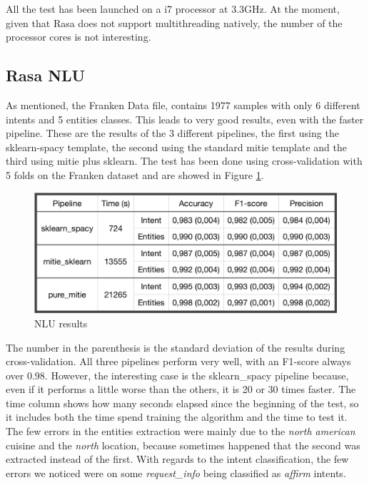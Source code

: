 \documentclass[11pt,a4paper]{article}
\begin{document}
All the test has been launched on a i7 processor at 3.3GHz. At the moment, given that Rasa does not support multithreading natively, the number of the processor cores is not interesting.

\subsection{Rasa NLU}

As mentioned, the Franken Data file, contains 1977 samples with only 6 different intents and 5 entities classes. This leads to very good results, even with the faster pipeline. These are the results of the 3 different pipelines, the first using the sklearn-spacy template, the second using the standard mitie template and the third using mitie plus sklearn. The test has been done using cross-validation with 5 folds on the Franken dataset and are showed in Figure \ref{fig:results1}.

\begin{figure}
  \includegraphics[scale=0.23]{nlu_results}
  \caption{NLU results}
  \label{fig:results1}
\end{figure}

The number in the parenthesis is the standard deviation of the results during cross-validation. All three pipelines perform very well, with an F1-score always over 0.98. However, the interesting case is the sklearn\_spacy pipeline because, even if it performs a little worse than the others, it is 20 or 30 times faster. The time column shows how many seconds elapsed since the beginning of the test, so it includes both the time spend training the algorithm and the time to test it. The few errors in the entities extraction were mainly due to the \textit{north american} cuisine and the \textit{north} location, because sometimes happened that the second was extracted instead of the first. With regards to the intent classification, the few errors we noticed were on some \textit{request\_info} being classified as \textit{affirm} intents.  
\end{document}
